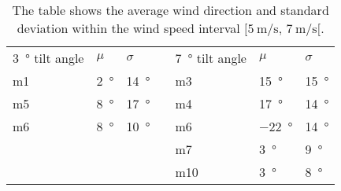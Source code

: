 \begin{table}[H]
\centering
\caption{The table shows the average wind direction and standard deviation within the wind speed interval $[\SI{5}{\meter\per\second},\, \SI{7}{\meter\per\second}[ $.}
\begin{tabular}{lllll|l|l}
\multicolumn{1}{l|}{\SI{3}{\degree} tilt angle} & \multicolumn{1}{l|}{$\mu$} & $\sigma$ &  &  \SI{7}{\degree} tilt angle & $\mu$ & $\sigma$  \\ \cline{1-3} \cline{5-7} 
\multicolumn{1}{l|}{m1} & \multicolumn{1}{l|}{\SI{2}{\degree} }& \SI{14}{\degree} &  & m3    & \SI{15}{\degree}        & \SI{15}{\degree}  \\
\multicolumn{1}{l|}{m5} & \multicolumn{1}{l|}{ \SI{8}{\degree}} & \SI{17}{\degree} &  & m4    & \SI{17}{\degree}        & \SI{14}{\degree}  \\
\multicolumn{1}{l|}{m6} & \multicolumn{1}{l|}{ \SI{8}{\degree} } & \SI{10}{\degree} &  &m6    & \SI{-22}{\degree}       & \SI{14}{\degree}  \\
                                     &                                                          &                            &   & m7    &  \SI{3}{\degree}         & \SI{9}{\degree}  \\
                                     &                                                          &                           &   & m10   & \SI{3}{\degree}         & \SI{8}{\degree}  
\end{tabular}
\label{ta:meas:approved_data_par_wind}
\end{table}
